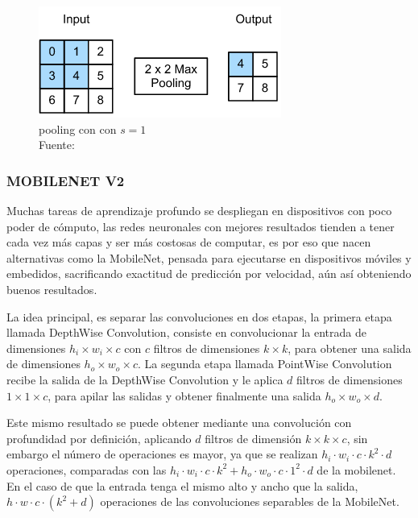         \begin{figure}[H]
            \centering
            \includegraphics[scale=0.6]{imagenes/pooling}
            \caption[Pooling con con $s=1$]{pooling con con $s=1$\\ Fuente: \citep{zhang2020dive}}
        \end{figure}
        
        \subsubsection{MOBILENET V2}
        	Muchas tareas de aprendizaje profundo se despliegan en dispositivos con poco poder de cómputo, las redes neuronales con mejores resultados tienden a tener cada vez más capas y ser más costosas de computar, es por eso que nacen alternativas como la MobileNet, pensada para ejecutarse en dispositivos móviles y embedidos, sacrificando exactitud de predicción por velocidad, aún así obteniendo buenos resultados.
        	
        	La idea principal, es separar las convoluciones en dos etapas, la primera etapa llamada DepthWise Convolution, consiste en convolucionar la entrada de dimensiones $h_i\times w_i\times c$ con $c$ filtros de dimensiones $k\times k$, para obtener una salida de dimensiones $h_o\times w_o\times c$. La segunda etapa llamada PointWise Convolution recibe la salida de la DepthWise Convolution y le aplica $d$ filtros de dimensiones $1\times 1\times c$, para apilar las salidas y obtener finalmente una salida $h_o\times w_o\times d$.
        	
        	Este mismo resultado se puede obtener mediante una convolución con profundidad por definición, aplicando $d$ filtros de dimensión $k\times k\times c$, sin embargo el número de operaciones es mayor, ya que se realizan $h_i\cdot w_i\cdot c\cdot k^2\cdot d$ operaciones, comparadas con  las $h_i\cdot w_i\cdot c\cdot k^2 + h_o\cdot w_o\cdot c\cdot 1^2\cdot d$ de la mobilenet. En el caso de que la entrada tenga el mismo alto y ancho que la salida, $h\cdot w\cdot c\cdot(k^2 + d)$ operaciones de las convoluciones separables de la MobileNet.
        	
